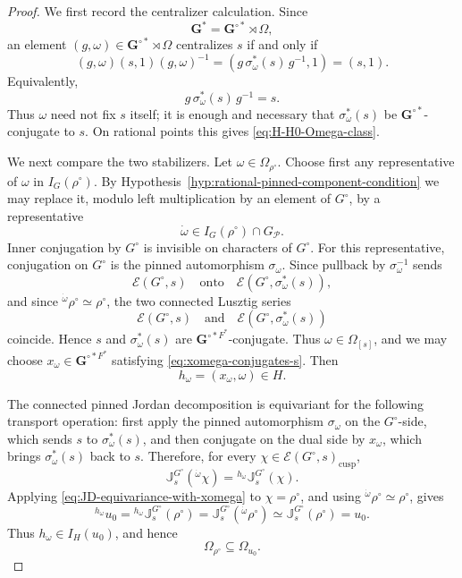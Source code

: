 \documentclass{amsart}
\theoremstyle{plain}
\numberwithin{equation}{section}
\theoremstyle{definition}
\newcommand{\cP}{\mathcal{P}}
\newcommand{\cE}{\mathcal{E}}
\newcommand{\J}{\mathbb{J}}
\newcommand{\cusp}{\operatorname{cusp}}
\newcommand{\bG}{\mathbf{G}}
\begin{document}
\begin{proof}
We first record the centralizer calculation.  Since
\[
\bG^*=\bG^{\circ *}\rtimes\Omega,
\]
an element \((g,\omega)\in \bG^{\circ *}\rtimes\Omega\) centralizes \(s\) if
and only if
\[
(g,\omega)(s,1)(g,\omega)^{-1}
=
(g\,\sigma_\omega^*(s)\,g^{-1},1)
=
(s,1).
\]
Equivalently,
\[
g\,\sigma_\omega^*(s)\,g^{-1}=s.
\]
Thus \(\omega\) need not fix \(s\) itself; it is enough and necessary that
\(\sigma_\omega^*(s)\) be \(\bG^{\circ *}\)-conjugate to \(s\).  On rational
points this gives \eqref{eq:H-H0-Omega-class}.

We next compare the two stabilizers.  Let \(\omega\in\Omega_{\rho^\circ}\).
Choose first any representative of \(\omega\) in \(I_G(\rho^\circ)\).  By
Hypothesis~\ref{hyp:rational-pinned-component-condition} we may replace it,
modulo left multiplication by an element of \(G^\circ\), by a representative
\[
        \dot\omega\in I_G(\rho^\circ)\cap G_{\cP}.
\]
Inner conjugation by \(G^\circ\) is invisible on characters of \(G^\circ\).  For
this representative, conjugation on \(G^\circ\) is the pinned automorphism
\(\sigma_\omega\).  Since pullback by \(\sigma_\omega^{-1}\) sends
\[
\cE(G^\circ,s)
\quad\text{onto}\quad
\cE(G^\circ,\sigma_\omega^*(s)),
\]
and since \({}^{\dot\omega}\rho^\circ\simeq\rho^\circ\), the two connected
Lusztig series
\[
\cE(G^\circ,s)
\quad\text{and}\quad
\cE(G^\circ,\sigma_\omega^*(s))
\]
coincide.  Hence \(s\) and \(\sigma_\omega^*(s)\) are
\(\bG^{\circ *F^*}\)-conjugate.  Thus \(\omega\in\Omega_{[s]}\), and we may
choose \(x_\omega\in\bG^{\circ *F^*}\) satisfying
\eqref{eq:xomega-conjugates-s}.  Then
\[
h_\omega=(x_\omega,\omega)\in H.
\]

The connected pinned Jordan decomposition is equivariant for the following
transport operation: first apply the pinned automorphism \(\sigma_\omega\) on
the \(G^\circ\)-side, which sends \(s\) to \(\sigma_\omega^*(s)\), and then
conjugate on the dual side by \(x_\omega\), which brings
\(\sigma_\omega^*(s)\) back to \(s\).  Therefore, for every
\(\chi\in\cE(G^\circ,s)_{\cusp}\),
\begin{equation}\label{eq:JD-equivariance-with-xomega}
\J_s^{G^\circ}({}^{\dot\omega}\chi)
=
{}^{h_\omega}\J_s^{G^\circ}(\chi).
\end{equation}
Applying \eqref{eq:JD-equivariance-with-xomega} to \(\chi=\rho^\circ\), and
using \({}^{\dot\omega}\rho^\circ\simeq\rho^\circ\), gives
\[
{}^{h_\omega}u_0
=
{}^{h_\omega}\J_s^{G^\circ}(\rho^\circ)
=
\J_s^{G^\circ}({}^{\dot\omega}\rho^\circ)
\simeq
\J_s^{G^\circ}(\rho^\circ)
=
u_0.
\]
Thus \(h_\omega\in I_H(u_0)\), and hence
\[
\Omega_{\rho^\circ}\subseteq\Omega_{u_0}.
\]


\end{proof}
\end{document}
